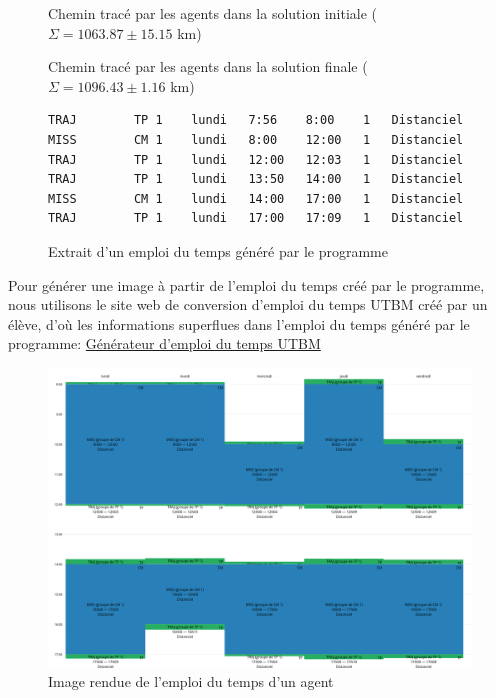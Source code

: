 \documentclass[11pt]{article}
\begin{document}
\begin{figure}[H]
    \caption{Chemin tracé par les agents dans la solution initiale ($\Sigma = 1063.87 \pm 15.15$ km)}
    
\end{figure}

\begin{figure}[H]
    \caption{Chemin tracé par les agents dans la solution finale ($\Sigma = 1096.43 \pm 1.16$ km)}
    
\end{figure}


\newpage
\begin{figure}[H]
    \centering
    \begin{lstlisting}
TRAJ 		TP 1 	lundi 	7:56 	8:00 	1 	Distanciel
MISS 		CM 1 	lundi 	8:00 	12:00 	1 	Distanciel
TRAJ 		TP 1 	lundi 	12:00 	12:03 	1 	Distanciel
TRAJ 		TP 1 	lundi 	13:50 	14:00 	1 	Distanciel
MISS 		CM 1 	lundi 	14:00 	17:00 	1 	Distanciel
TRAJ 		TP 1 	lundi 	17:00 	17:09 	1 	Distanciel
    \end{lstlisting}
    \caption{Extrait d'un emploi du temps généré par le programme}
    \label{fig:edt_raw}
\end{figure}


Pour générer une image à partir de l'emploi du temps créé par le programme, nous utilisons le site web de conversion d'emploi du temps UTBM créé par un élève, d'où les informations superflues dans l'emploi du temps généré par le programme: \href{https://codepen.io/TheRolf/full/gGbBoY?fbclid=IwAR0FcviTmRmV4PZjW4q8sscpVDDdAWsLMJvw682CjDEalOuPSbtQtzLUV24}{Générateur d'emploi du temps UTBM}


\begin{figure}[H]
    \centering
    \includegraphics[width=1\textwidth]{Images/edt.png}
    \caption{Image rendue de l'emploi du temps d'un agent}
    \label{fig:edt}
\end{figure}
\end{document}
